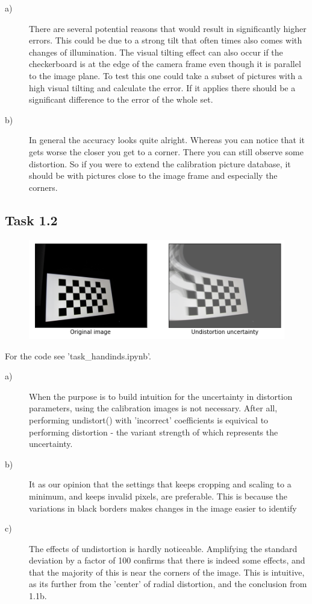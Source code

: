 \documentclass[a4paper]{article} %
\begin{document}
    \begin{description}
        \item [a)] There are several potential reasons that would result in significantly higher errors.
                This could be due to a strong tilt that often times also comes with changes of illumination.
                The visual tilting effect can also occur if the checkerboard is at the edge of the camera frame even though it is parallel to the image plane.
                To test this one could take a subset of pictures with a high visual tilting and calculate the error.
                If it applies there should be a significant difference to the error of the whole set.
        \item [b)] In general the accuracy looks quite alright.
                Whereas you can notice that it gets worse the closer you get to a corner.
                There you can still observe some distortion. 
                So if you were to extend the calibration picture database, it should be with pictures close to the image frame and especially the corners.
    \end{description}

    \subsection*{Task 1.2}

    \begin{figure}[H]
        \centering
        \includegraphics[width= 0.7 \linewidth]{deviation}
    \end{figure}
    For the code see 'task\_handinds.ipynb'.
    \begin{description}
        \item [a)] When the purpose is to build intuition for the uncertainty in distortion parameters, using the calibration images is not necessary.
                After all, performing undistort() with 'incorrect' coefficients is equivical to performing distortion - the variant strength of which represents the uncertainty.

        \item [b)] It as our opinion that the settings that keeps cropping and scaling to a minimum, and keeps invalid pixels, are preferable.
                This is because the variations in black borders makes changes in the image easier to identify

        \item [c)] The effects of undistortion is hardly noticeable.
                Amplifying the standard deviation by a factor of 100 confirms that there is indeed some effects, and that the majority of this is near the corners of the image.
                This is intuitive, as its further from the 'center' of radial distortion, and the conclusion from 1.1b.
    \end{description}
\end{document}
